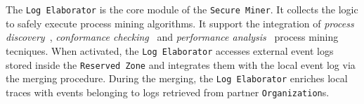 The \texttt{Log Elaborator} is the core module of the \texttt{Secure Miner}. It collects the logic to safely execute process mining algorithms. It support the integration of \textit{process discovery}~\cite{citation}, \textit{conformance checking}~\cite{citation} and \textit{performance analysis}~\cite{ciation} process mining tecniques. When activated, the \texttt{Log Elaborator} %
accesses external event logs stored inside the \texttt{Reserved Zone} and integrates them with the local event log via the merging procedure. %
During the merging, the \texttt{Log Elaborator} enriches local traces with events belonging to logs retrieved from partner \texttt{Organization}s.

